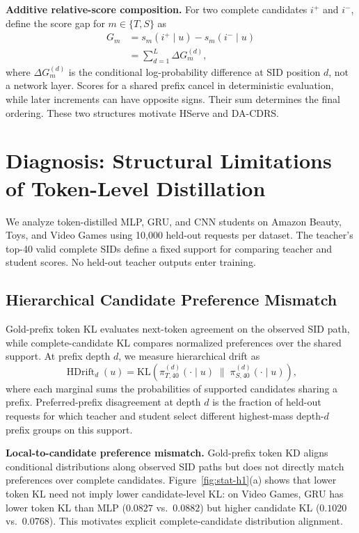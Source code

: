 \documentclass[sigconf, anonymous, review]{acmart}
\newcommand{\KL}{\mathrm{KL}}
\begin{document}
\textbf{Additive relative-score composition.} For two complete
candidates $i^+$ and $i^-$, define the score gap for
$m\in\{T,S\}$ as
\begin{equation}
\begin{aligned}
G_m &= s_m(i^+\mid u)-s_m(i^-\mid u)\\
&=\sum_{d=1}^{L}\Delta G_m^{(d)},
\end{aligned}
\label{eq:gap-decomp}
\end{equation}
where $\Delta G_m^{(d)}$ is the conditional log-probability
difference at SID position $d$, not a network layer.
Scores for a shared prefix cancel in deterministic evaluation,
while later increments can have opposite signs.
Their sum determines the final ordering. These two structures
motivate HServe and DA-CDRS.

\section{Diagnosis: Structural Limitations of Token-Level Distillation}
\label{sec:diagnosis}

We analyze token-distilled MLP, GRU, and CNN students on Amazon
Beauty, Toys, and Video Games using 10{,}000 held-out requests per
dataset. The teacher's top-40 valid complete SIDs define a fixed
support for comparing teacher and student scores. No held-out teacher
outputs enter training.

\subsection{Hierarchical Candidate Preference Mismatch}
\label{sec:diag-h1}

Gold-prefix token KL evaluates next-token agreement on the observed
SID path, while complete-candidate KL compares normalized preferences
over the shared support. At prefix depth $d$, we measure hierarchical
drift as
\begin{equation}
\operatorname{HDrift}_d(u)=
\KL\!\left(
\pi_{T,40}^{(d)}(\cdot\mid u)
\;\|\;
\pi_{S,40}^{(d)}(\cdot\mid u)
\right),
\label{eq:hdrift}
\end{equation}
where each marginal sums the probabilities of supported candidates
sharing a prefix. Preferred-prefix disagreement at depth $d$ is the
fraction of held-out requests for which teacher and student select
different highest-mass depth-$d$ prefix groups on this support.

\textbf{Local-to-candidate preference mismatch.} Gold-prefix token KD aligns conditional distributions along observed SID paths but does not directly match preferences over complete candidates. Figure~\ref{fig:stat-h1}(a) shows that lower token KL need not imply lower candidate-level KL: on Video Games, GRU has lower token KL than MLP ($0.0827$ vs.\ $0.0882$) but higher candidate KL ($0.1020$ vs.\ $0.0768$). This motivates explicit complete-candidate distribution alignment.
\end{document}
